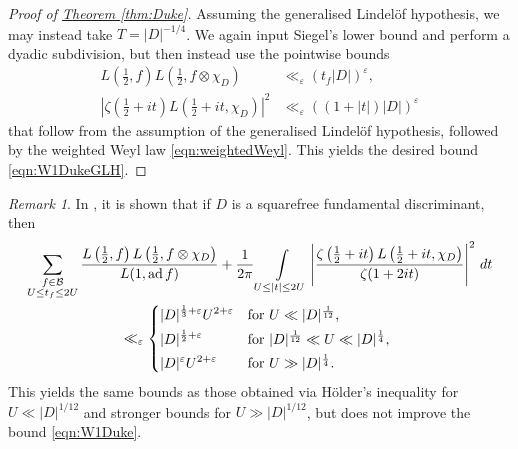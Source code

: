 \documentclass[11pt,a4paper]{amsart}
\newcommand{\BB}{\mathcal{B}}
\newcommand{\e}{\varepsilon}
\DeclareMathOperator{\ad}{ad}
\numberwithin{equation}{section}
\theoremstyle{remark}
\newtheorem{remark}[equation]{Remark}
\theoremstyle{definition}
\begin{document}
\begin{proof}[Proof of {\hyperref[thm:Duke]{Theorem \ref*{thm:Duke}}}]
Assuming the generalised Lindel\"{o}f hypothesis, we may instead take $T = |D|^{-1/4}$. We again input Siegel's lower bound and perform a dyadic subdivision, but then instead use the pointwise bounds
\begin{align*}
L\left(\frac{1}{2},f\right) L\left(\frac{1}{2}, f \otimes \chi_D\right) & \ll_{\e} (t_f |D|)^{\e},	\\
\left|\zeta\left(\frac{1}{2} + it\right) L\left(\frac{1}{2} + it,\chi_D\right)\right|^2 & \ll_{\e} ((1 + |t|) |D|)^{\e}
\end{align*}
that follow from the assumption of the generalised Lindel\"{o}f hypothesis, followed by the weighted Weyl law \eqref{eqn:weightedWeyl}. This yields the desired bound \eqref{eqn:W1DukeGLH}.
\end{proof}

\begin{remark}
In \cite[Proposition 2.14]{HR22}, it is shown that if $D$ is a squarefree fundamental discriminant, then
\begin{multline*}
\sum_{\substack{f \in \BB \\ U \leq t_f \leq 2U}} \frac{L\left(\frac{1}{2},f\right) L\left(\frac{1}{2},f \otimes \chi_D\right)}{L(1,\ad f)} + \frac{1}{2\pi} \int\limits_{U \leq |t| \leq 2U} \left|\frac{\zeta\left(\frac{1}{2} + it\right) L\left(\frac{1}{2} + it,\chi_D\right)}{\zeta(1 + 2it)}\right|^2 \, dt	\\
\ll_{\e} \begin{dcases*}
|D|^{\frac{1}{3} + \e} U^{2 + \e} & for $U \ll |D|^{\frac{1}{12}}$,	\\
|D|^{\frac{1}{2} + \e} & for $|D|^{\frac{1}{12}} \ll U \ll |D|^{\frac{1}{4}}$,	\\
|D|^{\e} U^{2 + \e} & for $U \gg |D|^{\frac{1}{4}}$.
\end{dcases*}
\end{multline*}
This yields the same bounds as those obtained via H\"{o}lder's inequality for $U \ll |D|^{1/12}$ and stronger bounds for $U \gg |D|^{1/12}$, but does not improve the bound \eqref{eqn:W1Duke}.
\end{remark}
\end{document}
